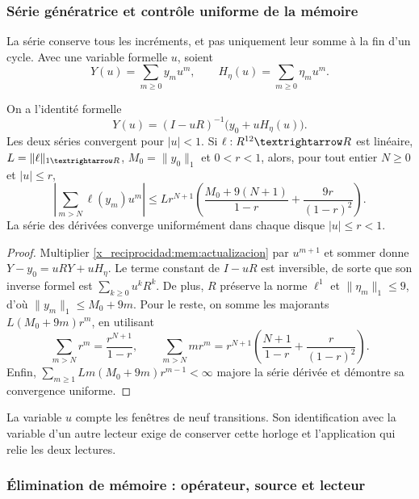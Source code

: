 \subsubsection{Série génératrice et contrôle uniforme de la mémoire}

La série conserve tous les incréments, et pas uniquement leur somme à la fin
d'un cycle. Avec une variable formelle \(u\), soient
\[
 Y(u)=\sum_{m\geq0}y_mu^m,\qquad
 H_\eta(u)=\sum_{m\geq0}\eta_mu^m.
\]

\begin{proposition}
\label{x_reciprocidad:mem:prop-serie}
On a l'identité formelle
\begin{equation}
 Y(u)=(I-uR)^{-1}\bigl(y_0+uH_\eta(u)\bigr).
 \label{x_reciprocidad:mem:serie}
\end{equation}
Les deux séries convergent pour \(|u|<1\). Si \(\ell:\RR^{12}\to\RR\)
est linéaire, \(L=\|\ell\|_{1\to\RR}\), \(M_0=\|y_0\|_1\) et
\(0<r<1\), alors, pour tout entier \(N\geq0\) et \(|u|\leq r\),
\begin{equation}
 \left|\sum_{m>N}\ell(y_m)u^m\right|
 \leq Lr^{N+1}\left(
 \frac{M_0+9(N+1)}{1-r}+\frac{9r}{(1-r)^2}\right).
 \label{x_reciprocidad:mem:cota}
\end{equation}
La série des dérivées converge uniformément dans chaque disque
\(|u|\leq r<1\).
\end{proposition}
\begin{proof}
Multiplier \eqref{x_reciprocidad:mem:actualizacion} par \(u^{m+1}\) et sommer donne
\(Y-y_0=uRY+uH_\eta\). Le terme constant de \(I-uR\) est
inversible, de sorte que son inverse formel est \(\sum_{k\geq0}u^kR^k\).
De plus, \(R\) préserve la norme \(\ell^1\) et
\(\|\eta_m\|_1\leq9\), d'où
\(\|y_m\|_1\leq M_0+9m\).
Pour le reste, on somme les majorants
\(L(M_0+9m)r^m\), en utilisant
\[
 \sum_{m>N}r^m=\frac{r^{N+1}}{1-r},\qquad
 \sum_{m>N}mr^m=r^{N+1}
 \left(\frac{N+1}{1-r}+\frac r{(1-r)^2}\right).
\]
Enfin, \(\sum_{m\geq1}Lm(M_0+9m)r^{m-1}<\infty\)
majore la série dérivée et démontre sa convergence uniforme.
\end{proof}

La variable \(u\) compte les fenêtres de neuf transitions. Son identification
avec la variable d'un autre lecteur exige de conserver cette horloge et l'application
qui relie les deux lectures.

\subsubsection{Élimination de mémoire : opérateur, source et lecteur}

